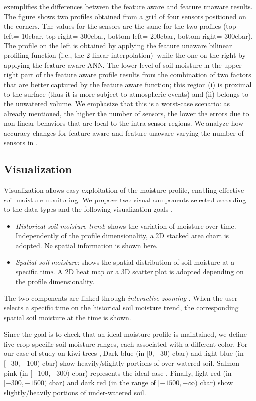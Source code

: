  exemplifies the differences between the feature aware and feature unaware results.
The figure shows two profiles obtained from a grid of four sensors positioned on the corners. The values for the sensors are the same for the two profiles (top-left=-10cbar, top-right=-300cbar, bottom-left=-200cbar, bottom-right=-300cbar).
The profile on the left is obtained by applying the feature unaware bilinear profiling function (i.e., the 2-linear interpolation), while the one on the right by applying the feature aware ANN.
The lower level of soil moisture in the upper right part of the feature aware profile results from the combination of two factors that are better captured by the feature aware function; this region (i) is proximal to the surface (thus it is more subject to atmospheric events) and (ii) belongs to the unwatered volume. 
We emphasize that this is a worst-case scenario: as already mentioned, the higher the number of sensors, the lower the errors due to non-linear behaviors that are local to the intra-sensor regions. 
We analyze how accuracy changes for feature aware and feature unaware varying the number of sensors in .

\subsection{Visualization}
Visualization allows easy exploitation of the moisture profile, enabling effective soil moisture monitoring. 
We propose two visual components selected according to the data types and the following visualization goals \cite{golfarelli2020model}.
\begin{itemize}
    \item \emph{Historical soil moisture trend}: shows the variation of moisture over time.
    Independently of the profile dimensionality, a 2D stacked area chart is adopted.
    No spatial information is shown here.
    \item \emph{Spatial soil moisture}: shows the spatial distribution of soil moisture at a specific time. A 2D heat map or a 3D scatter plot is adopted depending on the profile dimensionality.
\end{itemize}
The two components are linked through \emph{interactive zooming} \cite{keim2002information}. When the user selects a specific time on the historical soil moisture trend, the corresponding spatial soil moisture at the time is shown.

Since the goal is to check that an ideal moisture profile is maintained, we define five crop-specific soil moisture ranges, each associated with a different color.
For our case of study on kiwi-trees \cite{ABDS}, Dark blue (in $[0, -30)$ cbar) and light blue (in $[-30, -100)$ cbar) show heavily/slightly portions of over-watered soil. Salmon pink (in $[-100, -300)$ cbar) represents the ideal case \cite{miller1998effects}.
Finally, light red (in $[-300, -1500)$ cbar) and dark red (in the range of $[-1500, -\infty)$ cbar) show slightly/heavily portions of under-watered soil.

